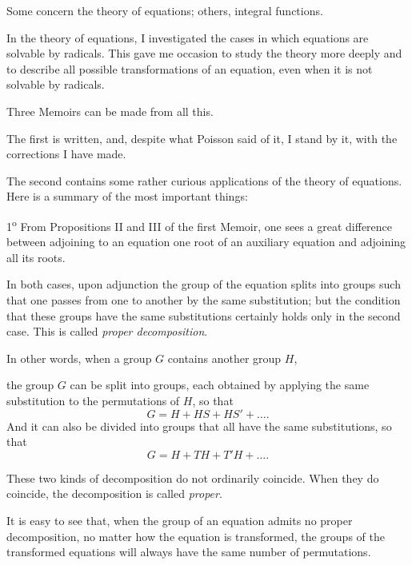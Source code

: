 Some concern the theory of equations; others, integral functions.

In the theory of equations, I investigated the cases in which equations
are solvable by radicals. This gave me occasion to study the theory more
deeply and to describe all possible transformations of an equation,
even when it is not solvable by radicals.

Three Memoirs can be made from all this.

The first is written, and, despite what Poisson said of it, I stand by
it, with the corrections I have made.

\medskip

The second contains some rather curious applications of the theory of
equations. Here is a summary of the most important things:

1\textsuperscript{o} From Propositions II and III of the first Memoir,
one sees a great difference between adjoining to an equation one root
of an auxiliary equation and adjoining all its roots.

In both cases, upon adjunction the group of the equation splits into
groups such that one passes from one to another by the same
substitution; but the condition that these groups have the same
substitutions certainly holds only in the second case. This is called
\emph{proper decomposition}.

In other words, when a group $G$ contains another group $H$,


the group $G$ can be split into groups, each obtained by applying the
same substitution to the permutations of $H$, so that
\[
G=H+HS+HS'+\ldots.
\]
And it can also be divided into groups that all have the same
substitutions, so that
\[
G=H+TH+T'H+\ldots.
\]

These two kinds of decomposition do not ordinarily coincide. When they
do coincide, the decomposition is called \emph{proper}.

It is easy to see that, when the group of an equation admits no proper
decomposition, no matter how the equation is transformed, the groups
of the transformed equations will always have the same number of
permutations.

